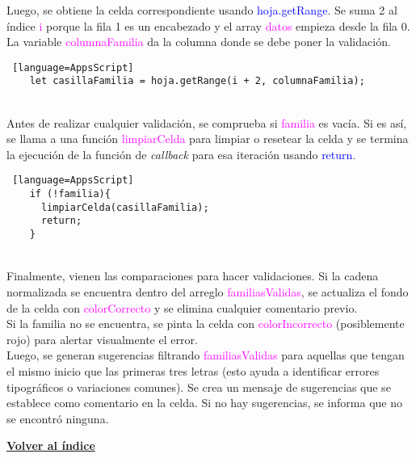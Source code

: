\documentclass[12pt]{article} %
\begin{document}
    Luego, se obtiene la celda correspondiente usando \textcolor{blue}{hoja.getRange}. Se suma 2 al índice \textcolor{magenta}{i} porque la fila 1 es un encabezado y el array \textcolor{magenta}{datos} empieza desde la fila 0. La variable \textcolor{magenta}{columnaFamilia} da la columna donde se debe poner la validación.\\
    
    \begin{lstlisting} [language=AppsScript]
    let casillaFamilia = hoja.getRange(i + 2, columnaFamilia);
    \end{lstlisting} \\

    Antes de realizar cualquier validación, se comprueba si \textcolor{magenta}{familia} es vacía. Si es así, se llama a una función \textcolor{magenta}{limpiarCelda} para limpiar o resetear la celda y se termina la ejecución de la función de \textit{callback} para esa iteración usando \textcolor{blue}{return}.

    \begin{lstlisting} [language=AppsScript]
    if (!familia){
      limpiarCelda(casillaFamilia);
      return;
    }
    \end{lstlisting} \\
   
    Finalmente, vienen las comparaciones para hacer validaciones. Si la cadena normalizada se encuentra dentro del arreglo \textcolor{magenta}{familiasValidas}, se actualiza el fondo de la celda con \textcolor{magenta}{colorCorrecto} y se elimina cualquier comentario previo. \\

    Si la familia no se encuentra, se pinta la celda con \textcolor{magenta}{colorIncorrecto} (posiblemente rojo) para alertar visualmente el error.\\

     Luego, se generan sugerencias filtrando \textcolor{magenta}{familiasValidas} para aquellas que tengan el mismo inicio que las primeras tres letras (esto ayuda a identificar errores tipográficos o variaciones comunes). Se crea un mensaje de sugerencias que se establece como comentario en la celda. Si no hay sugerencias, se informa que no se encontró ninguna.



     

    \begin{flushright}
        \hyperlink{toc}{\textbf{Volver al índice}}
    \end{flushright}
\end{document}
